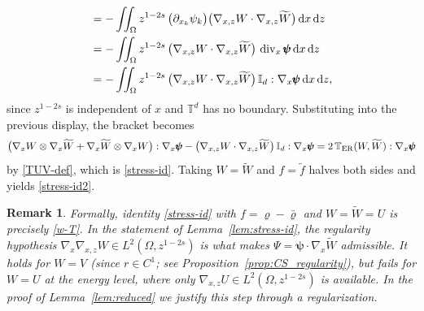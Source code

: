 \documentclass[12pt,a4paper,twoside]{article}
\newcommand{\vr}{\varrho}
\newcommand{\dx}{{\,\rm d} {x}}
\newtheorem{rmk}{Remark}
\numberwithin{equation}{section}%
\newcommand{\T}{\mathbb{T}}
\newcommand{\Om}{\Omega}
\newcommand{\dz}{{\rm d} z}
\newcommand{\Gradx}{\nabla_x}
\newcommand{\Gradxz}{\nabla_{x,z}}
\newcommand{\Divx}{\operatorname{div}_x}
\begin{document}
\begin{pf}
\begin{align*}
	&= -\iint_\Omega z^{1-2s}\,\big(\partial_{x_k}\psi_k\big)\big(\Gradxz W\cdot\Gradxz\widetilde W\big)  \dx \, \dz\\
	&= -\iint_\Omega z^{1-2s}\,\big(\Gradxz W\cdot\Gradxz\widetilde W\big)\,\Divx\pmb\psi  \dx \, \dz\\
	&= -\iint_\Omega z^{1-2s}\,\big(\Gradxz W\cdot\Gradxz\widetilde W\big)\,\mathbb I_d:\Gradx\pmb\psi  \dx \, \dz,
\end{align*}
	since $z^{1-2s}$ is independent of $x$ and $\mathbb T^d$ has no boundary. Substituting into the
	previous display, the bracket becomes
	\[
	\big(\Gradx W\otimes\Gradx\widetilde W + \Gradx\widetilde W\otimes\Gradx W\big):\Gradx\pmb\psi
	- \big(\Gradxz W\cdot\Gradxz\widetilde W\big)\,\mathbb I_d:\Gradx\pmb\psi
	= 2\,\T_{\rm ER}(W,\widetilde W):\Gradx\pmb\psi
	\]
	by \eqref{TUV-def}, which is \eqref{stress-id}. Taking $W=\widetilde W$ and $f=\widetilde f$ halves
	both sides and yields \eqref{stress-id2}. 
\end{pf}

\begin{rmk}\label{rem:stress-id-scope}
Formally, identity \eqref{stress-id} with $f=\vr-\bar\vr$ and $W=\widetilde{W}=U$ is precisely
\eqref{w-T}. In the statement of Lemma~\ref{lem:stress-id}, the regularity hypothesis
$\Gradx\Gradxz W\in L^2(\Om,z^{1-2s})$ is what makes $\Psi=\pmb\psi\cdot\Gradx\widetilde{W}$
admissible. It holds for $W=V$ (since $r\in C^1$; see Proposition~\ref{prop:CS_regularity}), but
\emph{fails} for $W=U$ at the energy level, where only $\Gradxz U\in L^2(\Om,z^{1-2s})$ is available.
In the proof of Lemma~\ref{lem:reduced} we justify this step through a regularization. %
\end{rmk}
\end{document}
